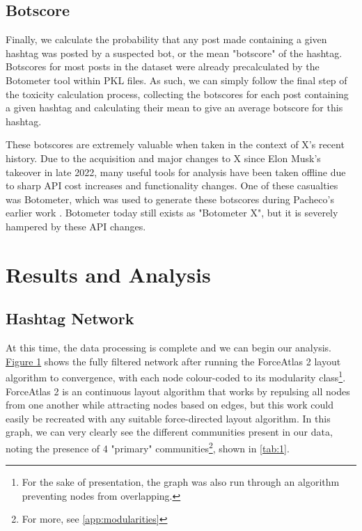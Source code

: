 \documentclass[a4paper,11pt]{article}  %
\begin{document}
	\subsection{Botscore}
	\label{subsec:botscore}
	Finally, we calculate the probability that any post made containing a given hashtag was posted by a suspected bot, or the mean "botscore" of the hashtag.
	Botscores for most posts in the dataset were already precalculated by the Botometer tool \parencite{sayyadiharikandehDetectionNovelSocial2020} within PKL files. As such, we can simply follow the final step of the toxicity calculation process, collecting the botscores for each post containing a given hashtag and calculating their mean to give an average botscore for this hashtag.

	These botscores are extremely valuable when taken in the context of X's recent history. Due to the acquisition and major changes to X since Elon Musk's takeover in late 2022, many useful tools for analysis have been taken offline due to sharp API cost increases and functionality changes. One of these casualties was Botometer, which was used to generate these botscores during Pacheco's earlier work \parencite{pachecoBotsElectionsControversies2023}. Botometer today still exists as "Botometer X", but it is severely hampered by these API changes.

	\section{Results and Analysis}
	\label{sec:results}
	\subsection{Hashtag Network}
	\label{subsec:network}

	At this time, the data processing is complete and we can begin our analysis. \hyperref[fig:1]{Figure 1} shows the fully filtered network after running the ForceAtlas 2 layout algorithm to convergence, with each node colour-coded to its modularity class\footnote{For the sake of presentation, the graph was also run through an algorithm preventing nodes from overlapping.}. ForceAtlas 2 is an continuous layout algorithm that works by repulsing all nodes from one another while attracting nodes based on edges\parencite{jacomyForceAtlas2ContinuousGraph2014}, but this work could easily be recreated with any suitable force-directed layout algorithm. In this graph, we can very clearly see the different communities present in our data, noting the presence of 4 "primary" communities\footnote{For more, see \autoref{app:modularities}}, shown in \autoref{tab:1}.
\end{document}
